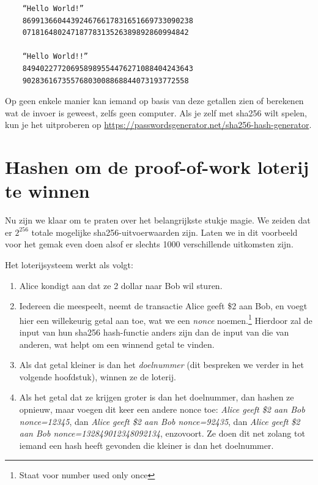 \begin{verbatim}
    “Hello World!”
    869913660443924676617831651669733090238
    07181648024718778313526389892860994842
   
    “Hello World!!”
    849402277206958989554476271088404243643
    90283616735576803008868844073193772558
    \end{verbatim}

Op geen enkele manier kan iemand op basis van deze getallen zien of berekenen wat de invoer is geweest, zelfs geen computer. Als je zelf met sha256 wilt spelen, kun je het uitproberen op \href{https://passwordsgenerator.net/sha256-hash-generator}{https://passwordsgenerator.net/sha256-hash-generator}.

\section{Hashen om de proof-of-work loterij te winnen}

Nu zijn we klaar om te praten over het belangrijkste stukje magie. We zeiden dat er $2^{256}$ totale mogelijke sha256-uitvoerwaarden zijn. Laten we in dit voorbeeld voor het gemak even doen alsof er slechts 1000 verschillende uitkomsten zijn.

Het loterijsysteem werkt als volgt:

\begin{enumerate}
    \item Alice kondigt aan dat ze 2 dollar naar \mbox{Bob} wil sturen.
    \item Iedereen die meespeelt, neemt de transactie \textquotedbl{}Alice geeft \$2 aan Bob\textquotedbl{}, en voegt hier een willekeurig getal aan toe, wat we een \textit{nonce} noemen.\footnote{Staat voor \textquotedbl{}number used only once\textquotedbl{}} Hierdoor zal de input van hun sha256 hash-functie anders zijn dan de input van die van anderen, wat helpt om een winnend getal te vinden.
    \item Als dat getal kleiner is dan het \textit{doelnummer} (dit bespreken we verder in het volgende hoofdstuk), winnen ze de loterij.
    \item Als het getal dat ze krijgen groter is dan het doelnummer, dan hashen ze opnieuw, maar voegen dit keer een andere nonce toe: \textit{\textquotedbl{}Alice geeft \$2 aan Bob nonce=12345\textquotedbl{}}, dan \textit{\textquotedbl{}Alice geeft \$2 aan Bob nonce=92435\textquotedbl{}}, dan \textit{\textquotedbl{}Alice geeft \$2 aan Bob nonce=132849012348092134\textquotedbl{}}, enzovoort. Ze doen dit net zolang tot iemand een hash heeft gevonden die kleiner is dan het doelnummer.
 \end{enumerate}   
 
